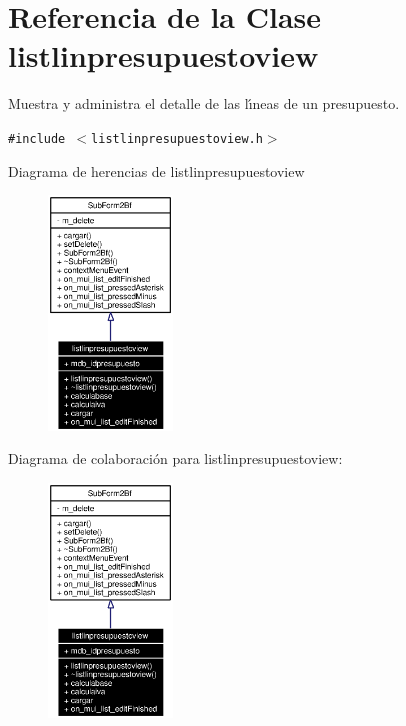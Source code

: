 \section{Referencia de la Clase listlinpresupuestoview}
\label{classlistlinpresupuestoview}
Muestra y administra el detalle de las l\'{\i}neas de un presupuesto.  


{\tt \#include $<$listlinpresupuestoview.h$>$}

Diagrama de herencias de listlinpresupuestoview\begin{figure}[H]
\begin{center}
\leavevmode
\includegraphics[width=94pt]{classlistlinpresupuestoview__inherit__graph}
\end{center}
\end{figure}
Diagrama de colaboraci\'{o}n para listlinpresupuestoview:\begin{figure}[H]
\begin{center}
\leavevmode
\includegraphics[width=94pt]{classlistlinpresupuestoview__coll__graph}
\end{center}
\end{figure}
